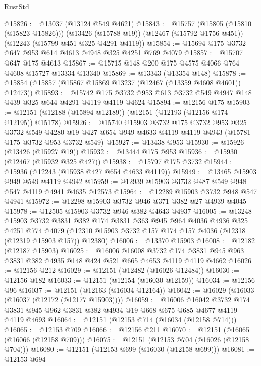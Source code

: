\begin{lexlean}{RustStd}
\begin{coremodule}
@15826 := @13037 (@13124 @549 @4621)
@15843 := @15757
    (@15805 (@15810 (@15823 @15826)))
    (@13426 (@15788 @19))
    (@12467 (@15792 @1756 @451))
    (@12243 (@15799 @451 @325 @4291 @4119))
@15854 := @15694 @175 @3732 @647 @953 @614 @4613 @4948 @325 @4251 @769 @4079
@15857 := @15707 @647 @175 @4613
@15867 := @15715 @148 @200 @175 @4575 @4066 @764 @4608 @15727 @13334 @13340
@15869 := @13343 (@13354 @148)
@15878 := @15854 (@15857 (@15867 @15869 @13237 (@12467 (@13359 @4608 @4601)) @12473))
@15893 := @15742 @175 @3732 @953 @613 @3732 @549 @4947 @148 @439 @325 @644 @4291 @4119 @4119 @4624
@15894 := @12156 @175
@15903 := @12151 (@12188 (@15894 @12189)) (@12151 (@12193 (@12156 @174 @12195)) @15178)
@15926 := @15740
    @15903
    @3732
    @175
    @3732
    @953
    @325
    @3732
    @549
    @4280
    @19
    @427
    @654
    @949
    @4633
    @4119
    @4119
    @4943
    (@15781 @175 @3732 @953 @3732 @549)
@15927 := @13438 @953
@15930 := @15926 (@13426 (@15927 @19))
@15932 := @13444 @175 @953
@15936 := @15930 (@12467 (@15932 @325 @427))
@15938 := @15797 @175 @3732
@15944 := @15936 (@12243 (@15938 @427 @654 @4633 @4119))
@15949 := @13465 @15903 @949 @549 @4119 @4942
@15959 := @12939 @15903 @3732 @487 @549 @948 @547 @4119 @4941 @4635 @12573
@15964 := @12289 @15903 @3732 @948 @547 @4941
@15972 := @12298 @15903 @3732 @946 @371 @382 @27 @4939 @4045
@15978 := @12505 @15903 @3732 @946 @382 @4643 @4937
@16005 := @13248
    @15903
    @3732
    @3831
    @382
    @174
    @3831
    @363
    @945
    @964
    @4036
    @4936
    @325
    @4251
    @774
    @4079
    (@12310 @15903 @3732 @157 @174 @157 @4036 (@12318 (@12319 @15903 @157)) @12380)
@16006 := @13370 @15903
@16008 := @12182 (@12187 @15903)
@16025 := @16006
    @16008
    @3732
    @174
    @3831
    @945
    @963
    @3831
    @382
    @4935
    @148
    @424
    @521
    @665
    @4653
    @4119
    @4119
    @4662
@16026 := @12156 @212
@16029 := @12151 (@12482 (@16026 @12484))
@16030 := @12156 @182
@16033 := @12151 (@12154 (@16030 @12159))
@16034 := @12156 @96
@16037 := @12151 (@12163 (@16034 @12164))
@16042 := @16029 (@16033 (@16037 (@12172 (@12177 @15903))))
@16059 := @16006
    @16042
    @3732
    @174
    @3831
    @945
    @962
    @3831
    @382
    @4934
    @19
    @668
    @675
    @685
    @4677
    @4119
    @4119
    @4693
@16064 := @12151 (@12153 @714 (@16034 (@12158 @714)))
@16065 := @12153 @709
@16066 := @12156 @211
@16070 := @12151 (@16065 (@16066 (@12158 @709)))
@16075 := @12151 (@12153 @704 (@16026 (@12158 @704)))
@16080 := @12151 (@12153 @699 (@16030 (@12158 @699)))
@16081 := @12153 @694

\end{coremodule}
\end{lexlean}
